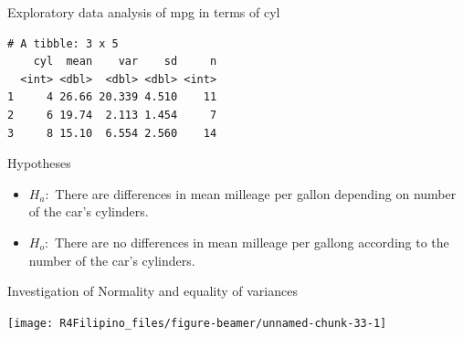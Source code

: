 \begin{frame}[fragile]{Exploratory data analysis of mpg in terms of cyl}

\begin{Shaded}
\end{Shaded}

\begin{verbatim}
# A tibble: 3 x 5
    cyl  mean    var    sd     n
  <int> <dbl>  <dbl> <dbl> <int>
1     4 26.66 20.339 4.510    11
2     6 19.74  2.113 1.454     7
3     8 15.10  6.554 2.560    14
\end{verbatim}

\end{frame}

\begin{frame}{Hypotheses}

\begin{itemize}
\item
  \(H_a:\) There are differences in mean milleage per gallon depending
  on number of the car's cylinders.
\item
  \(H_o:\) There are no differences in mean milleage per gallong
  according to the number of the car's cylinders.
\end{itemize}

\end{frame}

\begin{frame}[fragile]{Investigation of Normality and equality of
variances}

\begin{Shaded}
\begin{Highlighting}[]
\OperatorTok{~}\StringTok{ }
\end{Highlighting}
\end{Shaded}

\begin{center}\texttt{[image: R4Filipino\_files/figure-beamer/unnamed-chunk-33-1]} \end{center}

\end{frame}

